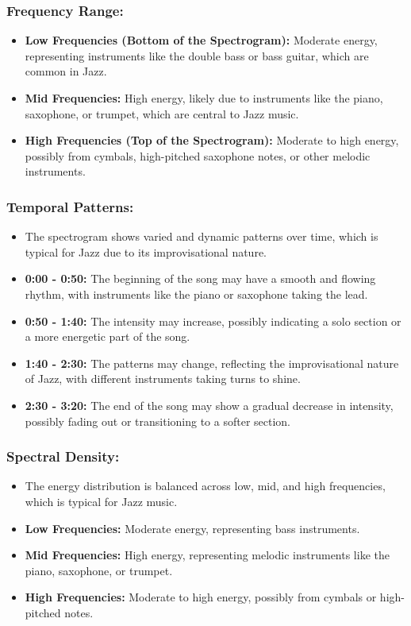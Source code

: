 \documentclass[a4paper,12pt]{article}
\begin{document}
\subsubsection{Frequency Range:}
\begin{itemize}
    \item \textbf{Low Frequencies (Bottom of the Spectrogram):} Moderate energy, representing instruments like the double bass or bass guitar, which are common in Jazz.
    \item \textbf{Mid Frequencies:} High energy, likely due to instruments like the piano, saxophone, or trumpet, which are central to Jazz music.
    \item \textbf{High Frequencies (Top of the Spectrogram):} Moderate to high energy, possibly from cymbals, high-pitched saxophone notes, or other melodic instruments.
\end{itemize}
\subsubsection{Temporal Patterns:}
\begin{itemize}
    \item The spectrogram shows varied and dynamic patterns over time, which is typical for Jazz due to its improvisational nature.
    \item \textbf{0:00 - 0:50:} The beginning of the song may have a smooth and flowing rhythm, with instruments like the piano or saxophone taking the lead.
    \item \textbf{0:50 - 1:40:} The intensity may increase, possibly indicating a solo section or a more energetic part of the song.
    \item \textbf{1:40 - 2:30:} The patterns may change, reflecting the improvisational nature of Jazz, with different instruments taking turns to shine.
    \item \textbf{2:30 - 3:20:} The end of the song may show a gradual decrease in intensity, possibly fading out or transitioning to a softer section.
\end{itemize}
\subsubsection{Spectral Density:}
\begin{itemize}
    \item The energy distribution is balanced across low, mid, and high frequencies, which is typical for Jazz music.
    \item \textbf{Low Frequencies:} Moderate energy, representing bass instruments.
    \item \textbf{Mid Frequencies:} High energy, representing melodic instruments like the piano, saxophone, or trumpet.
    \item \textbf{High Frequencies:} Moderate to high energy, possibly from cymbals or high-pitched notes.
\end{itemize}
\end{document}

